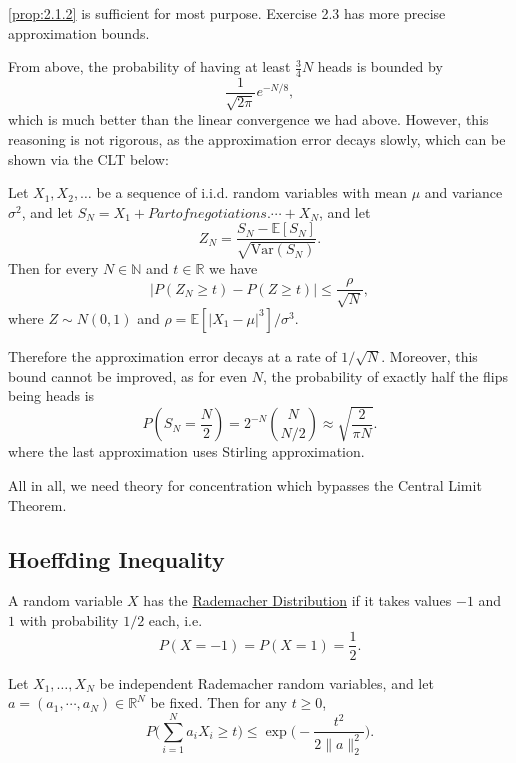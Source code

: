 \begin{remark}
\cref{prop:2.1.2} is sufficient for most purpose. Exercise 2.3 has more precise approximation bounds.
\end{remark}

From above, the probability of having at least $\frac{3}{4}N$ heads is bounded by 
\[ \frac{1}{\sqrt{2 \pi}}e^{-N / 8}, \]
which is much better than the linear convergence we had above. However, this reasoning is not rigorous, 
as the approximation error decays slowly, which can be shown via the CLT below: 

\begin{theorem}
\label{thm:2.1.4}
Let $X_1, X_2, \dots$ be a sequence of i.i.d. random variables with mean $\mu$ and variance 
$\sigma^2$, and let $S_N = X_1 + Part of negotiations.\cdots + X_N$, and let 
\[ Z_N = \frac{S_N - \mathbb{E}[S_N]}{\sqrt{\mathrm{Var}(S_N)}}. \]
Then for every $N \in \mathbb{N}$ and $t \in \mathbb{R}$ we have 
\[ |P(Z_N \geq t) - P(Z \geq t)| \leq \frac{\rho}{\sqrt{N}}, \]
where $Z \sim N(0, 1)$ and $\rho = \mathbb{E}[|X_1 - \mu|^3] / \sigma^3$.
\end{theorem}
Therefore the approximation error decays at a rate of $1 / \sqrt{N}$. Moreover, this bound cannot be improved, 
as for even $N$, the probability of exactly half the flips being heads is 
\[ P(S_N = \frac{N}{2}) = 2^{-N} \binom{N}{N/2} \approx \sqrt{\frac{2}{\pi N}}. \]
where the last approximation uses Stirling approximation.

All in all, we need theory for concentration which bypasses the Central Limit Theorem.



\subsection{Hoeffding Inequality}
A random variable $X$ has the \underline{Rademacher Distribution} if it takes values $-1$ and $1$ 
with probability $1/2$ each, i.e. 
\[ P(X = -1) = P(X = 1) = \frac{1}{2}. \]

\begin{theorem}
\label{thm:2.2.1}
Let $X_1, \dots, X_N$ be independent Rademacher random variables, and let $a = (a_1, \cdots, a_N) 
\in \mathbb{R}^N$ be fixed. Then for any $t \geq 0$, 
\[ P \biggl( \sum_{i = 1}^{N} a_iX_i \geq t \biggr) \leq \exp{\biggl( -\frac{t^2}{2\|a\|_2^2} \biggr)}. \]
\end{theorem}

